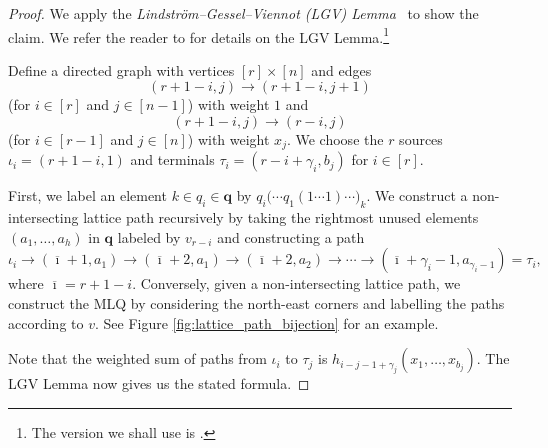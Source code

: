 \documentclass[reqno]{amsart}
\newcommand{\0}{\phantom{c}}
\newcommand{\qq}{\mathbf{q}}
\newcommand{\ive}[1]{\left[ #1 \right]}
\newcommand{\defn}[1]{{\color{darkred}\emph{#1}}} %
\theoremstyle{plain}
\theoremstyle{definition}
\numberwithin{equation}{section}
\begin{document}
\begin{proof}
We apply the \defn{Lindstr\"om--Gessel--Viennot (LGV) Lemma}~\cite{Lindstrom73,GV85} to show the claim.
We refer the reader to \cite[\S2]{GesVie89} for details on the LGV Lemma.\footnote{The version we shall use is \cite[Cor.~2]{GesVie89}.}

Define a directed graph with vertices $\ive{r} \times \ive{n}$ and edges
\[
(r+1-i,j) \to (r+1-i,j+1)
\]
(for $i \in \ive{r}$ and $j \in \ive{n-1}$) with weight $1$ and
\[
(r+1-i,j) \to (r-i,j)
\]
(for $i \in \ive{r-1}$ and $j \in \ive{n}$) with weight $x_j$. 
We choose the $r$ sources $\iota_i = (r+1-i, 1)$ and terminals $\tau_i = (r-i+\gamma_i,b_j)$ for $i \in \ive{r}$.

First, we label an element $k \in q_i \in \qq$ by $q_i\bigl( \cdots q_1(1 \cdots 1) \cdots \bigr)_k$.
We construct a non-intersecting lattice path recursively by taking the rightmost unused elements $(a_1, \dotsc, a_h)$ in $\qq$ labeled by $v_{r-i}$ and constructing a path
\newcommand{\patharrow}{ \xrightarrow{\hspace{10pt}} }
\[
\iota_i \patharrow (\overline{\imath} + 1, a_1) \patharrow (\overline{\imath} + 2, a_1) \patharrow (\overline{\imath} + 2, a_2) \patharrow \cdots \patharrow (\overline{\imath} + \gamma_i - 1, a_{\gamma_i - 1}) = \tau_i,
\]
where $\overline{\imath} = r + 1 - i$.
Conversely, given a non-intersecting lattice path, we construct the MLQ by considering the north-east corners and labelling the paths according to $v$.
See Figure \ref{fig:lattice_path_bijection} for an example.

Note that the weighted sum of paths from $\iota_i$ to $\tau_j$ is $h_{i-j-1+\gamma_j}(x_1, \dotsc, x_{b_j})$.
The LGV Lemma now gives us the stated formula.
\end{proof}
\end{document}
